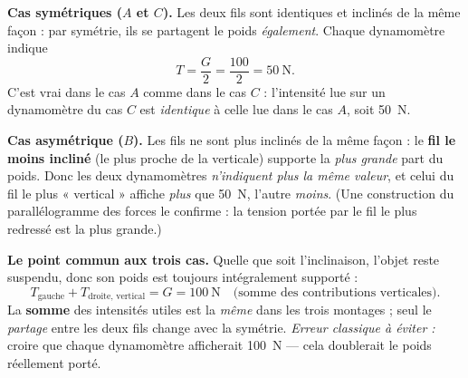 \documentclass[11pt,a4paper]{article}
\begin{document}
\begin{exemple}
\textbf{Cas symétriques ($A$ et $C$).} Les deux fils sont identiques et inclinés de la même façon :
par symétrie, ils se partagent le poids \emph{également}. Chaque dynamomètre indique
\[
T = \frac{G}{2} = \frac{100}{2} = \SI{50}{\newton}.
\]
C'est vrai dans le cas $A$ comme dans le cas $C$ : l'intensité lue sur un dynamomètre du cas $C$ est
\emph{identique} à celle lue dans le cas $A$, soit \SI{50}{\newton}.

\smallskip
\textbf{Cas asymétrique ($B$).} Les fils ne sont plus inclinés de la même façon : le \textbf{fil le moins
incliné} (le plus proche de la verticale) supporte la \emph{plus grande} part du poids. Donc les deux
dynamomètres \emph{n'indiquent plus la même valeur}, et celui du fil le plus « vertical » affiche
\emph{plus} que \SI{50}{\newton}, l'autre \emph{moins}. (Une construction du parallélogramme des
forces le confirme : la tension portée par le fil le plus redressé est la plus grande.)

\smallskip
\textbf{Le point commun aux trois cas.} Quelle que soit l'inclinaison, l'objet reste suspendu, donc
son poids est toujours intégralement supporté :
\[
T_{\text{gauche}} + T_{\text{droite, vertical}} = G = \SI{100}{\newton}
\quad\text{(somme des contributions verticales)}.
\]
La \textbf{somme} des intensités utiles est la \emph{même} dans les trois montages ; seul le
\emph{partage} entre les deux fils change avec la symétrie. \emph{Erreur classique à éviter :} croire
que chaque dynamomètre afficherait \SI{100}{\newton} — cela doublerait le poids réellement porté.
\end{exemple}

\end{document}
